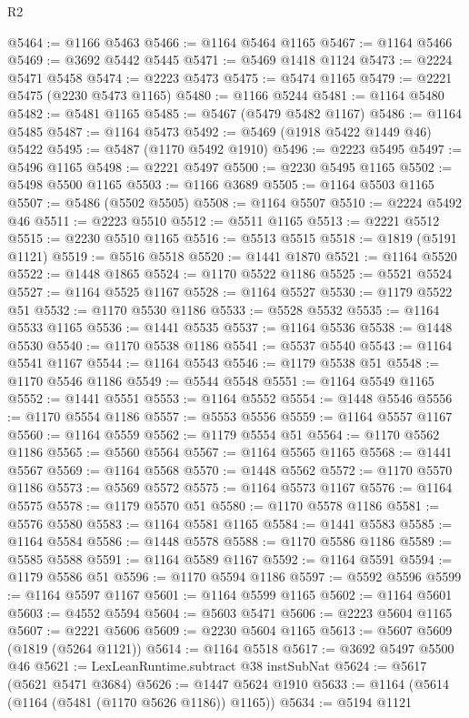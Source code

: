 \begin{lexlean}{R2}
\begin{coremodule}
@5464 := @1166 @5463
@5466 := @1164 @5464 @1165
@5467 := @1164 @5466
@5469 := @3692 @5442 @5445
@5471 := @5469 @1418 @1124
@5473 := @2224 @5471 @5458
@5474 := @2223 @5473
@5475 := @5474 @1165
@5479 := @2221 @5475 (@2230 @5473 @1165)
@5480 := @1166 @5244
@5481 := @1164 @5480
@5482 := @5481 @1165
@5485 := @5467 (@5479 @5482 @1167)
@5486 := @1164 @5485
@5487 := @1164 @5473
@5492 := @5469 (@1918 @5422 @1449 @46) @5422
@5495 := @5487 (@1170 @5492 @1910)
@5496 := @2223 @5495
@5497 := @5496 @1165
@5498 := @2221 @5497
@5500 := @2230 @5495 @1165
@5502 := @5498 @5500 @1165
@5503 := @1166 @3689
@5505 := @1164 @5503 @1165
@5507 := @5486 (@5502 @5505)
@5508 := @1164 @5507
@5510 := @2224 @5492 @46
@5511 := @2223 @5510
@5512 := @5511 @1165
@5513 := @2221 @5512
@5515 := @2230 @5510 @1165
@5516 := @5513 @5515
@5518 := @1819 (@5191 @1121)
@5519 := @5516 @5518
@5520 := @1441 @1870
@5521 := @1164 @5520
@5522 := @1448 @1865
@5524 := @1170 @5522 @1186
@5525 := @5521 @5524
@5527 := @1164 @5525 @1167
@5528 := @1164 @5527
@5530 := @1179 @5522 @51
@5532 := @1170 @5530 @1186
@5533 := @5528 @5532
@5535 := @1164 @5533 @1165
@5536 := @1441 @5535
@5537 := @1164 @5536
@5538 := @1448 @5530
@5540 := @1170 @5538 @1186
@5541 := @5537 @5540
@5543 := @1164 @5541 @1167
@5544 := @1164 @5543
@5546 := @1179 @5538 @51
@5548 := @1170 @5546 @1186
@5549 := @5544 @5548
@5551 := @1164 @5549 @1165
@5552 := @1441 @5551
@5553 := @1164 @5552
@5554 := @1448 @5546
@5556 := @1170 @5554 @1186
@5557 := @5553 @5556
@5559 := @1164 @5557 @1167
@5560 := @1164 @5559
@5562 := @1179 @5554 @51
@5564 := @1170 @5562 @1186
@5565 := @5560 @5564
@5567 := @1164 @5565 @1165
@5568 := @1441 @5567
@5569 := @1164 @5568
@5570 := @1448 @5562
@5572 := @1170 @5570 @1186
@5573 := @5569 @5572
@5575 := @1164 @5573 @1167
@5576 := @1164 @5575
@5578 := @1179 @5570 @51
@5580 := @1170 @5578 @1186
@5581 := @5576 @5580
@5583 := @1164 @5581 @1165
@5584 := @1441 @5583
@5585 := @1164 @5584
@5586 := @1448 @5578
@5588 := @1170 @5586 @1186
@5589 := @5585 @5588
@5591 := @1164 @5589 @1167
@5592 := @1164 @5591
@5594 := @1179 @5586 @51
@5596 := @1170 @5594 @1186
@5597 := @5592 @5596
@5599 := @1164 @5597 @1167
@5601 := @1164 @5599 @1165
@5602 := @1164 @5601
@5603 := @4552 @5594
@5604 := @5603 @5471
@5606 := @2223 @5604 @1165
@5607 := @2221 @5606
@5609 := @2230 @5604 @1165
@5613 := @5607 @5609 (@1819 (@5264 @1121))
@5614 := @1164 @5518
@5617 := @3692 @5497 @5500 @46
@5621 := LexLeanRuntime.subtract @38 instSubNat
@5624 := @5617 (@5621 @5471 @3684)
@5626 := @1447 @5624 @1910
@5633 := @1164 (@5614 (@1164 (@5481 (@1170 @5626 @1186)) @1165))
@5634 := @5194 @1121

\end{coremodule}
\end{lexlean}
